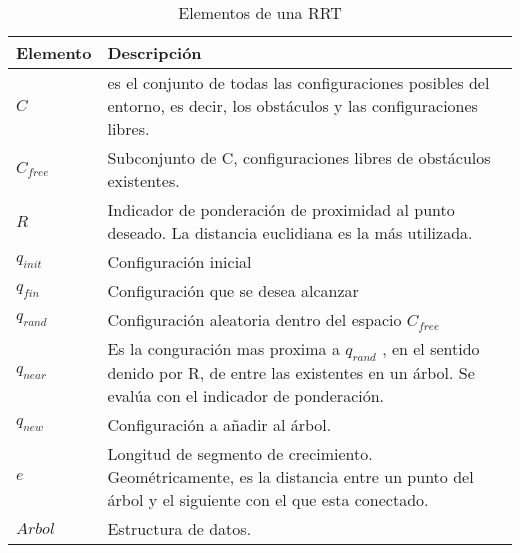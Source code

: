 \begin{table}[H]
\centering
\begin{tabular}{l>{\raggedright}p{4in}} \toprule
Elemento & \centering{}Descripción\tabularnewline\midrule
$C$ & es el conjunto de todas las configuraciones posibles del entorno,
es decir, los obstáculos y las configuraciones libres.\tabularnewline
$C_{free}$ & Subconjunto de C, configuraciones libres de obstáculos existentes.\tabularnewline
$R$ & Indicador de ponderación de proximidad al punto deseado. La distancia
euclidiana es la más utilizada.\tabularnewline
$q_{init}$ & Configuración inicial\tabularnewline
$q_{fin}$ & Configuración que se desea alcanzar\tabularnewline
$q_{rand}$ & Configuración aleatoria dentro del espacio $C_{free}$ \tabularnewline
$q_{near}$ & Es la conguración mas proxima a $q_{rand}$ , en el sentido denido
por R, de entre las existentes en un árbol. Se evalúa con el indicador
de ponderación.\tabularnewline
$q_{new}$ & Configuración a añadir al árbol.\tabularnewline
$e$ & Longitud de segmento de crecimiento. Geométricamente, es la distancia
entre un punto del árbol y el siguiente con el que esta conectado.\tabularnewline
$Arbol$ & Estructura de datos.\tabularnewline
\bottomrule
\end{tabular}

\caption{Elementos de una RRT}


\label{Flo:cnomen}
\end{table}
